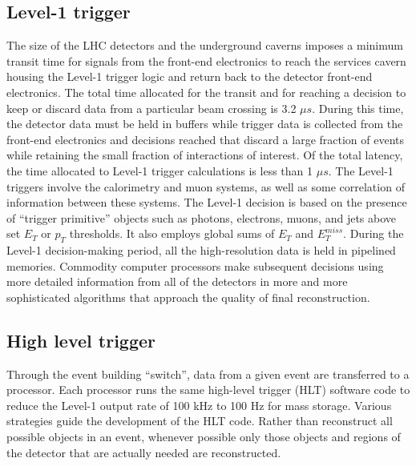 \subsection*{Level-1 trigger}
The size of the LHC detectors and the underground caverns imposes a minimum transit time
for signals from the front-end electronics to reach the services cavern housing the Level-1
trigger logic and return back to the detector front-end electronics. The total time allocated for
the transit and for reaching a decision to keep or discard data from a particular beam crossing
is 3.2 $\mu s$. During this time, the detector data must be held in buffers while trigger data is
collected from the front-end electronics and decisions reached that discard a large fraction of
events while retaining the small fraction of interactions of interest.
Of the total latency, the time allocated to Level-1 trigger calculations is less than 1 $\mu s$.
\newline The Level-1 triggers involve the calorimetry and muon systems, as well as some correlation of information between these
systems. The Level-1 decision is based on the presence of “trigger primitive” objects such
as photons, electrons, muons, and jets above set $E_{T}$ or $p_{T}$ thresholds. It also employs global
sums of $E_{T}$ and $E_{T}^{miss}$. During the Level-1 decision-making period, all the high-resolution data is held in pipelined
memories. Commodity computer processors make subsequent decisions using more detailed information from all of the detectors in more and more sophisticated algorithms that
approach the quality of final reconstruction.
 
\subsection*{High level trigger}
Through the event building ``switch'', data from
a given event are transferred to a processor. Each processor runs the same high-level trigger
(HLT) software code to reduce the Level-1 output rate of 100 kHz to 100 Hz for mass storage.
Various strategies guide the development of the HLT code. Rather than reconstruct all possible objects in an event, whenever possible only those objects and regions of the detector that
are actually needed are reconstructed.

